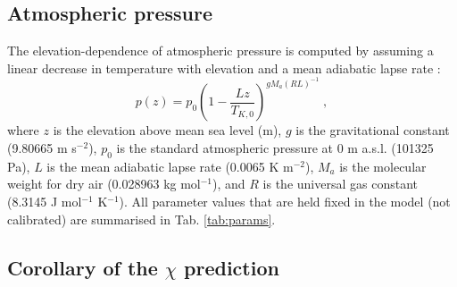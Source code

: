 \documentclass{myreport}
\begin{document}
\subsection{Atmospheric pressure}
\label{sec:press}
The elevation-dependence of atmospheric pressure is computed by assuming a linear decrease in temperature with elevation and a mean adiabatic lapse rate \citep{berberan97}:
\begin{equation}
\label{eq:pz}
    p(z) = p_0 \left( 
      1 - \frac{L z}{T_{K,0}} 
    \right)^{g M_a (R L)^{-1}} \;,
\end{equation} 
where $z$ is the elevation above mean sea level (m), $g$ is the gravitational constant (9.80665 m s$^{-2}$), $p_0$ is the standard atmospheric pressure at 0 m a.s.l. (101325 Pa), $L$ is the mean adiabatic lapse rate (0.0065 K m$^{-2}$), $M_a$ is the molecular weight for dry air (0.028963 kg mol$^{-1}$), and $R$ is the universal gas constant (8.3145 J mol$^{-1}$ K$^{-1}$). All parameter values that are held fixed in the model (not calibrated) are summarised in Tab. \ref{tab:params}.

\subsection{Corollary of the $\chi$ prediction}
\label{sec:corollary}
\end{document}
